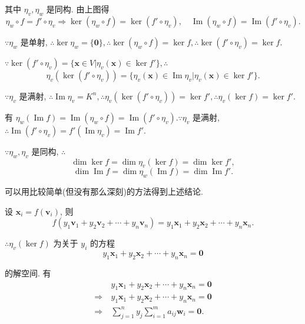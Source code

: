 \documentclass{ctexart}
\begin{document}
其中 $\eta_v,\eta_w$ 是同构. 由上图得
\[\eta_w\circ f=f'\circ\eta_v\Rightarrow\ker(\eta_w\circ f)=\ker(f'\circ\eta_v),\quad\operatorname{Im}(\eta_w\circ f)=\operatorname{Im}(f'\circ\eta_v).\]

$\because\eta_w$ 是单射, $\therefore\ker\eta_w=\{\boldsymbol{0}\},\therefore\ker(\eta_w\circ f)=\ker f,\therefore\ker(f'\circ\eta_v)=\ker f$.

$\because\ker(f'\circ\eta_v)=\{\boldsymbol{x}\in V|\eta_v(\boldsymbol{x})\in\ker f'\},\therefore$
\[\eta_v(\ker(f'\circ\eta_v))=\{\eta_v(\boldsymbol{x})\in\operatorname{Im}\eta_v|\eta_v(\boldsymbol{x})\in\ker f'\}.\]

$\because\eta_v$ 是满射, $\therefore\operatorname{Im}\eta_v=K^n,\therefore\eta_v(\ker(f'\circ\eta_v))=\ker f',\therefore\eta_v(\ker f)=\ker f'$.

有 $\eta_w(\operatorname{Im}f)=\operatorname{Im}(\eta_w\circ f)=\operatorname{Im}(f'\circ\eta_v).\because\eta_v$ 是满射, $\therefore\operatorname{Im}(f'\circ\eta_v)=f'(\operatorname{Im}\eta_v)=\operatorname{Im}f'$.

$\because\eta_w,\eta_v$ 是同构, $\therefore$
\[\dim\ker f=\dim\eta_v(\ker f)=\dim\ker f',\]
\begin{equation}\label{eq1.2}
    \dim\operatorname{Im}f=\dim\eta_w(\operatorname{Im}f)=\dim\operatorname{Im}f'.
\end{equation}

可以用比较简单(但没有那么深刻)的方法得到上述结论.

设 $\boldsymbol{x}_i=f(\boldsymbol{v}_i)$, 则
\[f(y_1\boldsymbol{v}_1+y_2\boldsymbol{v}_2+\cdots+y_n\boldsymbol{v}_n)=y_1\boldsymbol{x}_1+y_2\boldsymbol{x}_2+\cdots+y_n\boldsymbol{x}_n.\]

$\therefore\eta_v(\ker f)$ 为关于 $y_i$ 的方程
\begin{equation}\label{eq1.3}
    y_1\boldsymbol{x}_1+y_2\boldsymbol{x}_2+\cdots+y_n\boldsymbol{x}_n=\boldsymbol{0}
\end{equation}

的解空间. 有
\begin{align*}
    & \ y_1\boldsymbol{x}_1+y_2\boldsymbol{x}_2+\cdots+y_n\boldsymbol{x}_n=\boldsymbol{0} \\
    \Rightarrow & \ y_1\boldsymbol{x}_1+y_2\boldsymbol{x}_2+\cdots+y_n\boldsymbol{x}_n=\boldsymbol{0} \\
    \Rightarrow & \ \sum\limits_{j=1}^ny_j\sum\limits_{i=1}^ma_{ij}\boldsymbol{w}_i=\boldsymbol{0}.
\end{align*}
\end{document}
